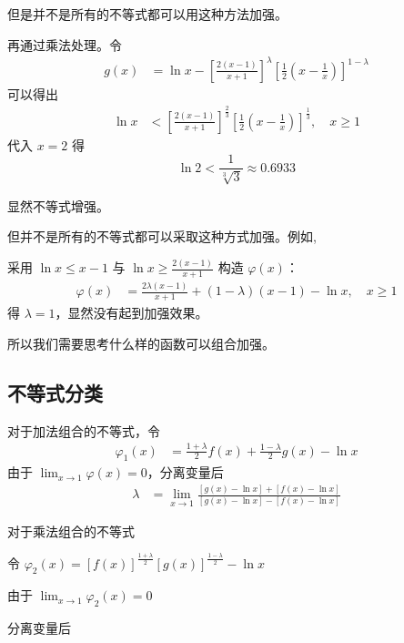 \documentclass[12pt]{article}
\theoremstyle{definition}
\theoremstyle{plain}
\theoremstyle{definition}
\begin{document}
但是并不是所有的不等式都可以用这种方法加强。

再通过乘法处理。令
\begin{align*}
g(x) &= \ln x - \left\lbrack \frac{2(x - 1)}{x + 1} \right\rbrack^{\lambda}\left\lbrack \frac{1}{2}\left( x - \frac{1}{x} \right) \right\rbrack^{1 - \lambda}
\end{align*}
可以得出
\begin{align*}
\ln x &< \left\lbrack \frac{2(x - 1)}{x + 1} \right\rbrack^{\frac{2}{3}}\left\lbrack \frac{1}{2}\left( x - \frac{1}{x} \right) \right\rbrack^{\frac{1}{3}}, \quad x \geq 1
\end{align*}
代入 \(x = 2\) 得
\[\ln 2 < \frac{1}{\sqrt[3]{3}} \approx 0.6933\]

显然不等式增强。

但并不是所有的不等式都可以采取这种方式加强。例如,

采用 \(\ln x \leq x - 1\) 与 \(\ln x \geq \frac{2(x - 1)}{x + 1}\) 构造 \(\varphi(x)\)：
\begin{align*}
\varphi(x) &= \frac{2\lambda(x - 1)}{x + 1} + (1 - \lambda)(x - 1) - \ln x, \quad x \geq 1
\end{align*}
得 \(\lambda = 1\)，显然没有起到加强效果。

所以我们需要思考什么样的函数可以组合加强。

\subsection{不等式分类}

对于加法组合的不等式，令
\begin{align*}
\varphi_{1}(x) &= \frac{1 + \lambda}{2}f(x) + \frac{1 - \lambda}{2}g(x) - \ln x
\end{align*}
由于 \(\lim_{x \rightarrow 1}\varphi(x) = 0\)，分离变量后
\begin{align*}
\lambda &= \lim_{x \rightarrow 1}\frac{\left\lbrack g(x) - \ln x \right\rbrack + \left\lbrack f(x) - \ln x \right\rbrack}{\left\lbrack g(x) - \ln x \right\rbrack - \left\lbrack f(x) - \ln x \right\rbrack}
\end{align*}

对于乘法组合的不等式

令
\(\varphi_{2}(x) = \left\lbrack f(x) \right\rbrack^{\frac{1 + \lambda}{2}}\left\lbrack g(x) \right\rbrack^{\frac{1 - \lambda}{2}} - \ln x\)

由于 \(\lim_{x \rightarrow 1}\varphi_{2}(x) = 0\)

分离变量后
\end{document}
